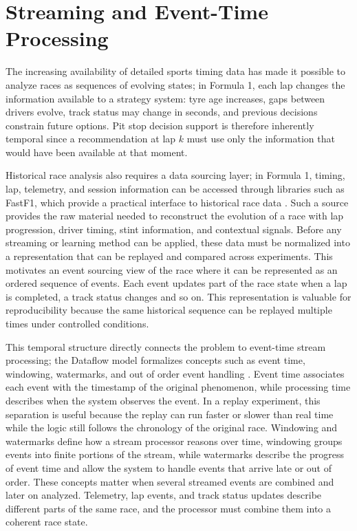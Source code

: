 \section{Streaming and Event-Time Processing}

The increasing availability of detailed sports timing data has made it possible to analyze races as sequences of evolving states;
in Formula 1, each lap changes the information available to a strategy system: tyre age increases, gaps between drivers evolve, track status may
change in seconds, and previous decisions constrain future options. Pit stop decision support is therefore inherently temporal since a recommendation at lap $k$ must use only
the information that would have been available at that moment.

Historical race analysis also requires a data sourcing layer; in Formula 1, timing, lap, telemetry, and session information can be accessed through libraries such as FastF1,
which provide a practical interface to historical race data \cite{Oehrly2025}. Such a source provides the raw material needed to reconstruct the evolution
of a race with lap progression, driver timing, stint information, and contextual signals. Before any streaming or learning method can be applied, these data must be normalized
into a representation that can be replayed and compared across experiments.
This motivates an event sourcing view of the race where it can be represented as an ordered sequence of
events. Each event updates part of the race state when a lap is completed, a track status changes and so on. This representation
is valuable for reproducibility because the same historical sequence can be replayed multiple times under controlled conditions.

This temporal structure directly connects the problem to event-time stream processing; the Dataflow model formalizes concepts such as event time, windowing, watermarks,
and out of order event handling \citep{akidau2015dataflow}. Event time associates each event with the timestamp of the original phenomenon, while processing time
describes when the system observes the event. In a replay experiment, this separation is useful because the replay can run faster or slower than real time while the
logic still follows the chronology of the original race.
Windowing and watermarks define how a stream processor reasons over time, windowing groups events into finite portions of the stream, while watermarks describe the
progress of event time and allow the system to handle events that arrive late or out of order. These concepts matter when several streamed events are combined and later on analyzed.
Telemetry, lap events, and track status updates describe different parts of the same race, and the processor must combine them into a coherent race state.

